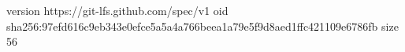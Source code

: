 version https://git-lfs.github.com/spec/v1
oid sha256:97efd616c9eb343e0efce5a5a4a766beea1a79e5f9d8aed1ffc421109e6786fb
size 56

